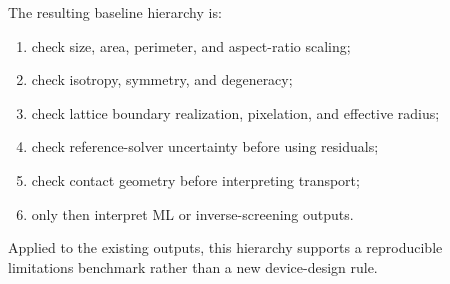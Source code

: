 The resulting baseline hierarchy is:
\begin{enumerate}
    \item check size, area, perimeter, and aspect-ratio scaling;
    \item check isotropy, symmetry, and degeneracy;
    \item check lattice boundary realization, pixelation, and effective radius;
    \item check reference-solver uncertainty before using residuals;
    \item check contact geometry before interpreting transport;
    \item only then interpret ML or inverse-screening outputs.
\end{enumerate}
Applied to the existing outputs, this hierarchy supports a reproducible
limitations benchmark rather than a new device-design rule.
